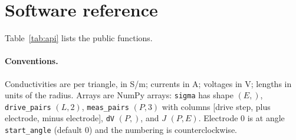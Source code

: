 \documentclass[11pt,a4paper]{article}
\newcommand{\code}[1]{\texttt{#1}}
\begin{document}
\section{Software reference}

Table~\ref{tab:api} lists the public functions.

\paragraph{Conventions.} Conductivities are per triangle, in S/m; currents
in A; voltages in V; lengths in units of the radius. Arrays are NumPy
arrays: \code{sigma} has shape $(E,)$, \code{drive\_pairs} $(L,2)$,
\code{meas\_pairs} $(P,3)$ with columns [drive step, plus electrode, minus
electrode], \code{dV} $(P,)$, and $J$ $(P,E)$. Electrode 0 is at angle
\code{start\_angle} (default 0) and the numbering is counterclockwise.
\end{document}
